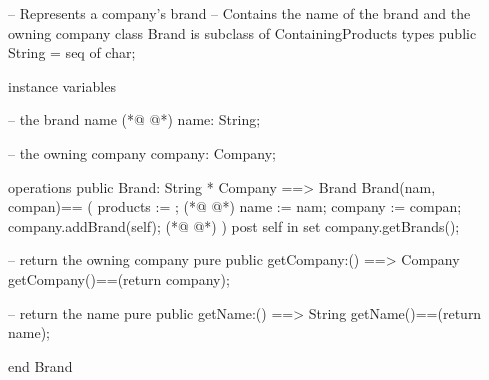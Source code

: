 \begin{vdmpp}[breaklines=true]
-- Represents a company's brand
-- Contains the name of the brand and the owning company
class Brand is subclass of ContainingProducts
 types
  public String = seq of char;
  
 instance variables
 
   -- the brand name
(*@
\label{Brand:10}
@*)
  name: String;
  
  -- the owning company
   company: Company;
  
  operations 
   public Brand: String * Company ==> Brand
   Brand(nam, compan)==
   (
    products := {};
(*@
\label{getCompany:20}
@*)
    name := nam;
    company := compan;
    company.addBrand(self);
(*@
\label{getName:23}
@*)
   )
   post self in set company.getBrands();
   
   -- return the owning company
   pure public getCompany:() ==> Company
   getCompany()==(return company);
   
   -- return the name
   pure public getName:() ==> String
   getName()==(return name);
   
end Brand
\end{vdmpp}
